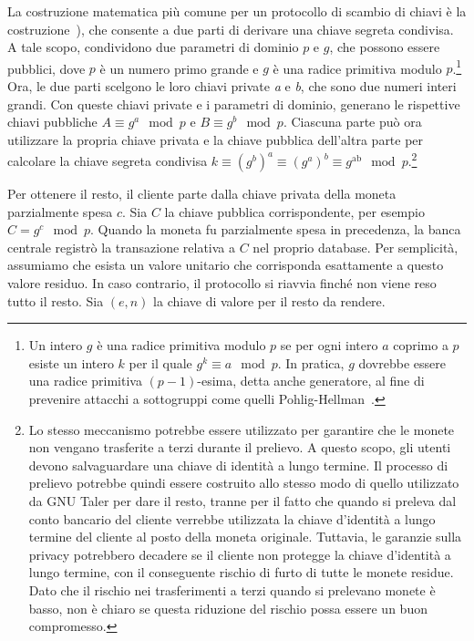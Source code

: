 \documentclass{article}
\begin{document}
La costruzione matematica più comune per un protocollo di scambio di
chiavi è la costruzione~\cite{Diffie}), che
consente a due parti di derivare una chiave segreta condivisa. A tale
scopo, condividono due parametri di dominio $p$ e $g$, che possono
essere pubblici, dove $p$ è un numero primo grande e $g$ è una radice
primitiva modulo $p$.\footnote{Un intero $g$ è una radice primitiva
modulo $p$ se per ogni intero $a$ coprimo a $p$ esiste un intero $k$
per il quale
$g^k \equiv a \mod p$.
In pratica, $g$ dovrebbe essere una radice primitiva $(p-1)$-esima, detta
anche generatore, al fine di prevenire attacchi a sottogruppi come quelli
Pohlig-Hellman~\cite[vedi][]{Lim}.} Ora, le due parti scelgono le loro
chiavi private \emph{a} e \emph{b}, che sono due numeri interi grandi.
Con queste chiavi private e i parametri di dominio, generano le
rispettive chiavi pubbliche
$A \equiv g^{a} \mod p$ e $B \equiv g^{b} \mod p$.
Ciascuna parte può ora utilizzare la propria chiave privata e la chiave
pubblica dell'altra parte per calcolare la chiave segreta condivisa
$k \equiv \left( g^b \right)^{a} \equiv \left( g^{a} \right)^{b} \equiv g^{\text{ab}} \mod p$.\footnote{
Lo stesso meccanismo potrebbe essere utilizzato per garantire
che le monete non vengano trasferite a terzi durante il prelievo. A
questo scopo, gli utenti devono salvaguardare una chiave di identità a
lungo termine. Il processo di prelievo potrebbe quindi essere
costruito allo stesso modo di quello utilizzato da GNU Taler per dare
il resto, tranne per il fatto che quando si preleva dal conto bancario
del cliente verrebbe utilizzata la chiave d'identità a lungo termine
del cliente al posto della moneta originale. Tuttavia, le garanzie
sulla privacy potrebbero decadere se il cliente non protegge la chiave
d'identità a lungo termine, con il conseguente rischio di furto di
tutte le monete residue. Dato che il rischio nei trasferimenti a terzi
quando si prelevano monete è basso, non è chiaro se questa riduzione
del rischio possa essere un buon compromesso.}

Per ottenere il resto, il cliente parte dalla chiave privata della
moneta parzialmente spesa $c$. Sia $C$ la chiave pubblica corrispondente,
per esempio
$C = g^{c} \mod p$.
Quando la moneta fu parzialmente spesa in precedenza, la banca centrale
registrò la transazione relativa a $C$ nel proprio database. Per
semplicità, assumiamo che esista un valore unitario che corrisponda
esattamente a questo valore residuo. In caso contrario, il protocollo si
riavvia finché non viene reso tutto il resto. Sia $(e,n)$ la
chiave di valore per il resto da rendere.
\end{document}
